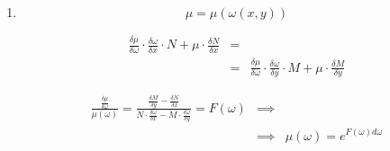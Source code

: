 \documentclass{report}
\theoremstyle{definition}
\begin{document}
\begin{enumerate}
    \item \begin{equation*}
              \mu = \mu(\omega(x,y))
          \end{equation*}

          \begin{eqnarray*}
              \frac{\delta \mu}{\delta \omega} \cdot \frac{\delta \omega}{\delta x} \cdot N + \mu \cdot \frac{\delta N}{\delta x} & = &\\
              & = & \frac{\delta \mu}{\delta \omega} \cdot \frac{\delta \omega}{\delta y} \cdot M + \mu \cdot \frac{\delta M}{\delta y}
          \end{eqnarray*}

          \begin{eqnarray*}
              \frac{\frac{\delta \mu}{\delta \omega}}{\mu(\omega)} = \frac{\frac{\delta M}{\delta y} - \frac{\delta N}{\delta x}}{N\cdot \frac{\delta \omega}{\delta x} - M\cdot \frac{\delta \omega}{\delta y}} = F(\omega) & \implies & \\
              & \implies & \mu(\omega) = e^{F(\omega)d\omega}
          \end{eqnarray*}
\end{enumerate}
\end{document}
